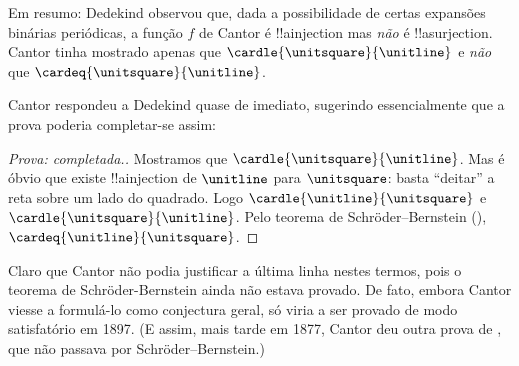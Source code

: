 \documentclass[../../../include/open-logic-section]{subfiles}
\begin{document}
Em resumo: Dedekind observou que, dada a possibilidade de
certas expansões binárias periódicas, a função $f$ de Cantor é
!!a{injection} mas \emph{não} é !!a{surjection}. Cantor tinha mostrado
apenas que $\cardle{\unitsquare}{\unitline}$ e \emph{não} que
$\cardeq{\unitsquare}{\unitline}$.

Cantor respondeu a Dedekind quase de imediato, sugerindo
essencialmente que a prova poderia completar-se assim:

\begin{proof}[Prova: completada.]
Mostramos que $\cardle{\unitsquare}{\unitline}$. Mas é óbvio que existe
!!a{injection} de $\unitline$ para $\unitsquare$: basta ``deitar'' a reta sobre um lado do quadrado. Logo
$\cardle{\unitline}{\unitsquare}$ e
$\cardle{\unitsquare}{\unitline}$. Pelo teorema de Schr\"{o}der--Bernstein
(),
$\cardeq{\unitline}{\unitsquare}$.
\end{proof}

Claro que Cantor não podia justificar a última linha nestes termos,
pois o teorema de Schröder-Bernstein ainda não estava provado. De fato,
embora Cantor viesse a formulá-lo como conjectura geral, só viria a ser
provado de modo satisfatório em 1897. (E assim,
mais tarde em 1877, Cantor deu outra prova de
, que não passava por
Schr\"{o}der--Bernstein.)
\end{document}
